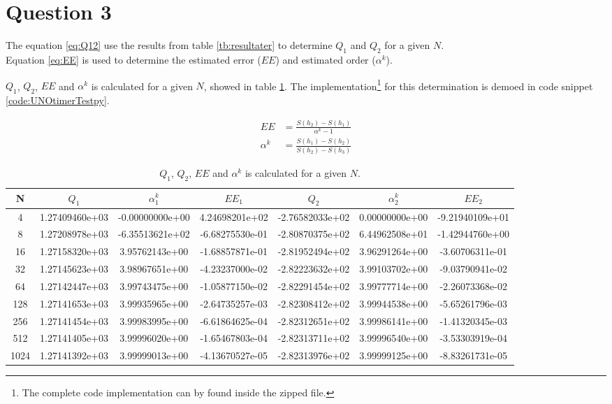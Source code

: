 \newpage
\section*{Question 3}

The equation \ref{eq:Q12} use the results from table \ref{tb:resultater} to determine  \( Q_1  \) and \( Q_2  \)  for a given \( N \).\\
Equation \ref{eq:EE} is used to determine the estimated error (\( EE \)) and estimated order (\( \alpha^k \)). 

\( Q_1  \), \( Q_2  \), \( EE \) and \( \alpha^k \) is calculated for a given \( N \), showed in table \ref{tb:resultater1}. The implementation\footnote{The complete code implementation can by found inside the zipped file.} for this determination is demoed in code snippet \ref{code:UNOtimerTestpy}.

\begin{equation}
\begin{align*}
EE&=\frac { S\left( h_{ 2 } \right) -S\left( h_{ 1 } \right)  }{ \alpha ^{ k }-1 } \\ 
\alpha ^{ k }&=\frac { S\left( h_{ 1 } \right) -S\left( h_{ 2 } \right)  }{ S\left( h_{ 2 } \right) -S\left( h_{ 3 } \right)  } 
\end{align*}
\label{eq:EE}
\end{equation}



\begin{table}[th!]
\centering
\begin{tabular}{c|c|c|c|c|c|c}
 N &  \( Q_1 \) & \( { \alpha }_{  1}^{ k } \) & \(  EE_1 \) & \( Q_2 \) & \(  { \alpha }_{  2}^{ k } \) & \( EE_2 \)  \\\hline
4&1.27409460e+03&-0.00000000e+00&4.24698201e+02&-2.76582033e+02&0.00000000e+00&-9.21940109e+01\\
8&1.27208978e+03&-6.35513621e+02&-6.68275530e-01&-2.80870375e+02&6.44962508e+01&-1.42944760e+00\\
16&1.27158320e+03&3.95762143e+00&-1.68857871e-01&-2.81952494e+02&3.96291264e+00&-3.60706311e-01\\
32&1.27145623e+03&3.98967651e+00&-4.23237000e-02&-2.82223632e+02&3.99103702e+00&-9.03790941e-02\\
64&1.27142447e+03&3.99743475e+00&-1.05877150e-02&-2.82291454e+02&3.99777714e+00&-2.26073368e-02\\
128&1.27141653e+03&3.99935965e+00&-2.64735257e-03&-2.82308412e+02&3.99944538e+00&-5.65261796e-03\\
256&1.27141454e+03&3.99983995e+00&-6.61864625e-04&-2.82312651e+02&3.99986141e+00&-1.41320345e-03 \\
512&1.27141405e+03&3.99996020e+00&-1.65467803e-04&-2.82313711e+02&3.99996540e+00&-3.53303919e-04 \\
1024&1.27141392e+03&3.99999013e+00&-4.13670527e-05&-2.82313976e+02&3.99999125e+00&-8.83261731e-05 \\
\end{tabular}
\caption[tekst i indholdsfortegnelsen]{\( Q_1  \), \( Q_2  \), \( EE \) and \( \alpha^k \) is calculated for a given \( N \).}
\label{tb:resultater1}
\end{table}




